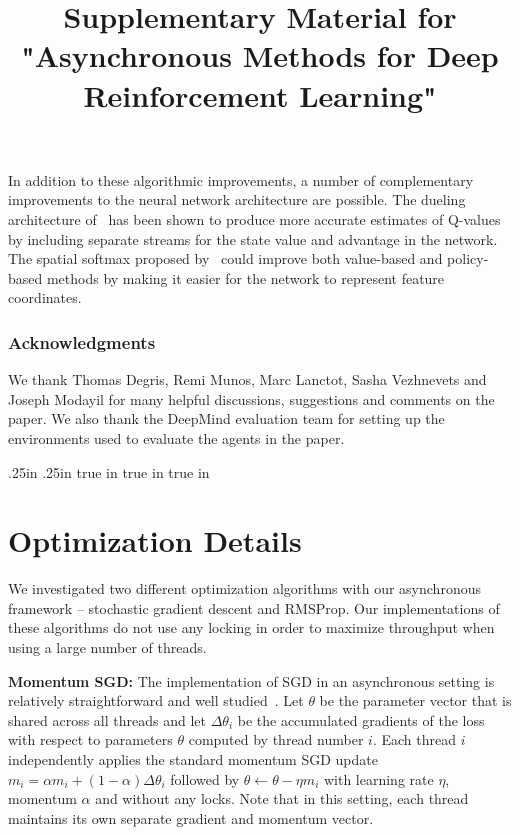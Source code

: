 \documentclass{article} %
\begin{document}
In addition to these algorithmic improvements, a number of complementary improvements to the neural network architecture are possible.
The dueling architecture of~\cite{wang2015dueling} has been shown to produce more accurate estimates of Q-values by including separate streams for the state value and advantage in the network.
The spatial softmax proposed by~\cite{levine2015endtoend} could improve both value-based and policy-based methods by making it easier for the network to represent feature coordinates.


\subsubsection*{Acknowledgments}
We thank Thomas Degris, Remi Munos, Marc Lanctot, Sasha Vezhnevets and Joseph Modayil for many helpful discussions, suggestions and comments on the paper.
We also thank the DeepMind evaluation team for setting up the environments used to evaluate the agents in the paper.
\clearpage



\clearpage

\renewcommand{\thealgorithm}{S\arabic{algorithm}}
\renewcommand{\thefigure}{S\arabic{figure}}
\renewcommand{\theequation}{S\arabic{equation}}
\renewcommand{\thetable}{S\arabic{table}}

\oddsidemargin .25in    %
\evensidemargin .25in
 true in
\topmargin -0.5in
\addtolength{\headsep}{0.25in}
 true in       %
 true in        %
\onecolumn
%
%
%
\title{Supplementary Material for "Asynchronous Methods for Deep Reinforcement Learning"}
\maketitle
\thispagestyle{empty}

\label{supplementary}

\section{Optimization Details}
\label{sec:opt}
We investigated two different optimization algorithms with our asynchronous framework -- stochastic gradient descent and RMSProp.  Our implementations of these algorithms do not use any locking in order to maximize throughput when using a large number of threads.

\textbf{Momentum SGD:}
The implementation of SGD in an asynchronous setting is relatively straightforward and well studied~\citep{recht2011hogwild}.
Let $\theta$ be the parameter vector that is shared across all threads and let $\Delta\theta_i$ be the accumulated gradients of the loss with respect to parameters $\theta$ computed by thread number $i$.
Each thread $i$ independently applies the standard momentum SGD update $m_i = \alpha m_i + (1-\alpha) \Delta\theta_i$ followed by $\theta \gets \theta - \eta m_i$ with learning rate $\eta$, momentum $\alpha$ and without any locks.
Note that in this setting, each thread maintains its own separate gradient and momentum vector.
\end{document}
